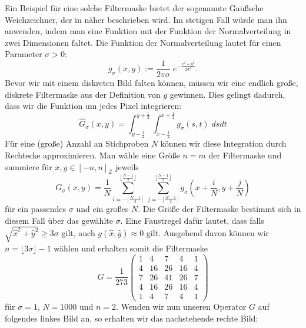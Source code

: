 \documentclass[a4paper, 11pt]{report}
\theoremstyle{definition}
\begin{document}
		Ein Beispiel für eine solche Filtermaske bietet der sogenannte Gaußsche Weichzeichner, der in \cite{gaussianblur} näher beschrieben wird. Im stetigen Fall würde man ihn anwenden, indem man eine Funktion mit der Funktion der Normalverteilung in zwei Dimensionen faltet. Die Funktion der Normalverteilung lautet für einen Parameter $\sigma > 0$:
		$$ g_\sigma(x,y) := \frac{1}{2 \pi \sigma} \;e ^{-\frac{x^2 + y^2}{2\sigma^2}}. $$
		Bevor wir mit einem diskreten Bild falten können, müssen wir eine endlich große, diskrete Filtermaske aus der Definition von $g$ gewinnen. Dies gelingt dadurch, dass wir die Funktion um jedes Pixel integrieren:
		$$\hat G_\sigma(x,y) = \int_{y-\frac{1}{2}}^{y+\frac{1}{2}} \int_{x-\frac{1}{2}}^{x+\frac{1}{2}} g_\sigma(s,t) \; ds dt$$
		Für eine (große) Anzahl an Stichproben $N$ können wir diese Integration durch Rechtecke approximieren.
		Man wähle eine Größe $n = m$ der Filtermaske und summiere für $x,y \in [-n, n]_\mathbb{Z}$ jeweils
		$$G_\sigma(x,y) = \frac{1}{N}\sum_{i=-\lceil\frac{N-1}{2}\rceil}^{\lfloor\frac{N-1}{2}\rfloor}\, \sum_{j=-\lceil\frac{N-1}{2}\rceil}^{\lfloor\frac{N-1}{2}\rfloor} g_\sigma(x+\frac{i}{N},y+\frac{j}{N})$$
		für ein passendes $\sigma$ und ein großes $N$.
		Die Größe der Filtermaske bestimmt sich in diesem Fall über das gewählte $\sigma$. Eine Faustregel dafür lautet, dass falls $\sqrt{\hat x^2 + \hat y^2} \geq 3\sigma$ gilt, auch $g(\hat x,\hat y) \approx 0$ gilt. Ausgehend davon können wir $n = \lfloor3\sigma\rfloor-1$ wählen und erhalten somit die Filtermaske
		$$G = \frac{1}{273}
		\begin{pmatrix}
			1&4&7&4&1\\
			4&16&26&16&4\\
			7&26&41&26&7\\
			4&16&26&16&4\\
			1&4&7&4&1
		\end{pmatrix}$$
 		für $\sigma = 1$, $N = 1000$ und $n = 2$. Wenden wir nun unseren Operator $G$ auf folgendes linkes Bild an, so erhalten wir das nachstehende rechte Bild:
\end{document}
